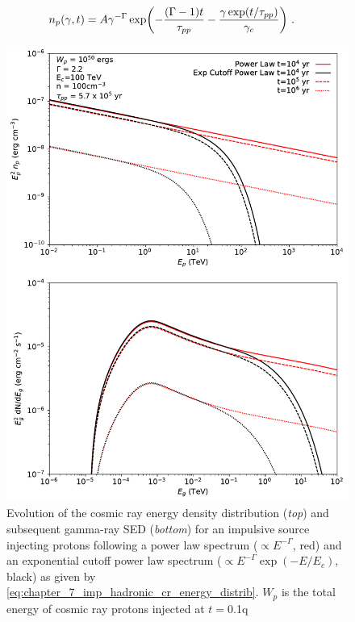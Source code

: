 \begin{equation}
    \begin{aligned}
       	n_p\qty(\gamma,t)&=A\gamma^{-\Gamma}\exp(-\frac{\qty(\Gamma-1)t}{\tau_{pp}}-\frac{\gamma\exp(t/\tau_{pp})}{\gamma_c})\text{ .}
    \end{aligned} \label{eq:chapter_7_imp_hadronic_cr_energy_distrib}
\end{equation}
\begin{figure}[hbtp]
	\centering
	\includegraphics[width=1.0\textwidth]{07_Particle_Evolution/Images/evolution/impulsive_proton_total_spectrum.pdf}
	\caption{Evolution of the cosmic ray energy density distribution (\textit{top}) and subsequent gamma-ray SED (\textit{bottom}) for an impulsive source injecting protons following a power law spectrum ($\propto E^{-\Gamma}$, red) and an exponential cutoff power law spectrum ($\propto E^{-\Gamma}\exp(-E/E_c)$, black) as given by \autoref{eq:chapter_7_imp_hadronic_cr_energy_distrib}. $W_p$ is the total energy of cosmic ray protons injected at $t=0$.1q}
	\label{fig:chapter_7_impulsive_hadron_cr_spectrum}
\end{figure}


